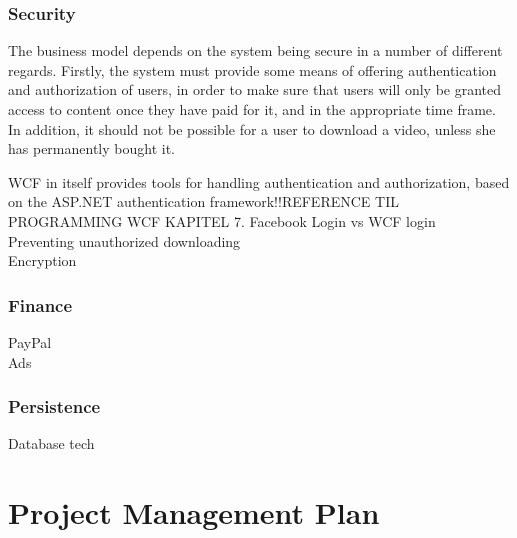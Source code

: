 \subsubsection{Security}
The business model depends on the system being secure in a number of different regards. Firstly, the system must provide some means of offering authentication and authorization of users, in order to make sure that users will only be granted access to content once they have paid for it, and in the appropriate time frame. In addition, it should not be possible for a user to download a video, unless she has permanently bought it.

WCF in itself provides tools for handling authentication and authorization, based on the ASP.NET authentication framework!!REFERENCE TIL PROGRAMMING WCF KAPITEL 7. 
Facebook Login vs WCF login\\
Preventing unauthorized downloading\\
Encryption\\
\subsubsection{Finance}
PayPal\\
Ads\\
\subsubsection{Persistence}
Database tech

\section{Project Management Plan}